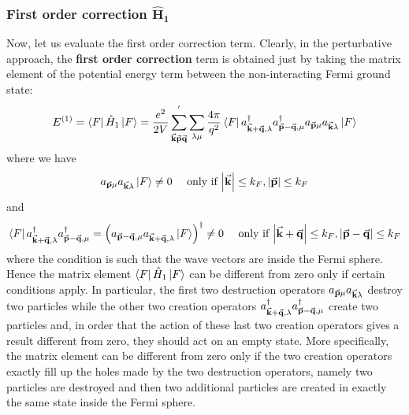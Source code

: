 \documentclass[../main/main.tex]{subfiles}
\begin{document}

\subsubsection{First order correction \(\pmb{\hat{H}_1}\)}

Now, let us evaluate the first order correction term. Clearly, in the perturbative approach, the \textbf{first order correction} term  is obtained just by taking the matrix element of the potential energy term between the non-interacting Fermi ground state:
\begin{equation*}
  E^{(1)} = \bra{F} \hat{H}_1 \ket{F}
  = \frac{e^2}{2V} \sum_{\va{k}\va{p}\va{q}}^{'} \sum_{\lambda \mu }^{} \frac{4 \pi }{q^2} \bra{F} a_{\va{k} + \va{q}, \lambda }^\dag a_{\va{p}- \va{q}, \mu } ^\dag a_{\va{p} \mu } a_{\va{k} \lambda } \ket{F}
\end{equation*}
where we have
\begin{equation*}
  a_{\va{p} \mu } a_{\va{k} \lambda } \ket{F}  \neq 0 \quad  \text{ only if } \abs{\va{k}} \le k_F, \abs{\va{p}} \le k_F
\end{equation*}
and
\begin{equation*}
  \bra{F} a_{\va{k} + \va{q}, \lambda }^\dag a_{\va{p}- \va{q}, \mu } ^\dag = \qty(  a_{\va{p}- \va{q}, \mu } a_{\va{k} + \va{q}, \lambda } \ket{F} ) ^\dag \neq 0
  \quad  \text{ only if } \abs{\va{k} + \va{q}} \le k_F, \abs{\va{p} - \va{q}} \le k_F
\end{equation*}
where the condition is such that the wave vectors are inside the Fermi sphere.
Hence the matrix element \( \bra{F} \hat{H}_1 \ket{F}    \) can be different from zero only if certain conditions apply. In particular, the first two destruction operators \(   a_{\va{p} \mu } a_{\va{k} \lambda } \) destroy two particles while the other two creation operators \( a_{\va{k} + \va{q}, \lambda }^\dag a_{\va{p}- \va{q}, \mu } ^\dag  \) create two particles and, in order that the action of these last two creation operators gives a result different from zero, they should act on an empty state.
More specifically, the matrix element can be different from zero only if the two creation operators exactly fill up the holes made by the two destruction operators, namely two particles are destroyed and then two additional particles are created in exactly the same state inside the Fermi sphere.
\end{document}
